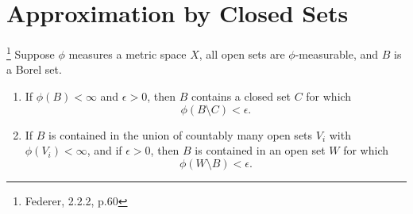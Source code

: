 \section{Approximation by Closed Sets}

\begin{theorem} \label{T:Fed2.2.2}
\footnote{Federer, 2.2.2, p.60}
Suppose $\phi$ measures a metric space $X$, all open sets are $\phi$-measurable,
and $B$ is a Borel set.
\begin{enumerate}
  \item[(1)] If $\phi(B)<\infty$ and $\epsilon>0$, then $B$ contains a closed
  set $C$ for which
  \[
    \phi(B\setminus C)<\epsilon.
  \]
  \item[(2)] If $B$ is contained in the union of countably many open sets $V_i$
  with $\phi(V_i)<\infty$, and if $\epsilon>0$, then $B$ is contained in an open
  set $W$ for which 
  \[
    \phi(W\setminus B)<\epsilon.
  \]
\end{enumerate}
\end{theorem}
